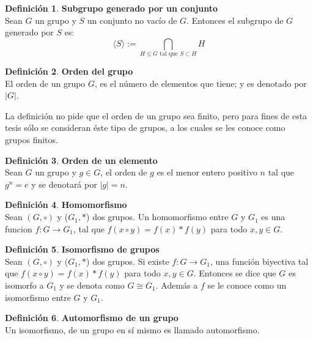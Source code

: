 \documentclass[11pt]{book}
\theoremstyle{definition}
\newtheorem{definition}{Definición}
\begin{document}
\begin{definition}\textbf{Subgrupo generado por un conjunto}\\
  Sean $G$ un grupo y $S$ un conjunto no vacío de $G$. Entonces el
  subgrupo de $G$ generado por $S$ es:
\begin{equation*}
\langle S \rangle := \bigcap_{\text{$H\le G$ tal que $S \subset H$}}H
\end{equation*}
\end{definition}

\begin{definition}\textbf{Orden del grupo}\\
  El orden de un grupo $G$, es el número de elementos que tiene; y es
  denotado por $|G|$.
\end{definition}

La definición no pide que el orden de un grupo sea finito, pero
para fines de esta tesis sólo se consideran éste tipo de grupos, a los
cuales se les conoce como grupos finitos.

\begin{definition}\textbf{Orden de un elemento}\\
  Sean $G$ un grupo y $g\in G$, el orden de $g$ es el menor entero
  positivo $n$ tal que $g^n=e$ y se denotará por $|g|=n$.
\end{definition}

\begin{definition}{\textbf{Homomorfismo}}\\ Sean $(G,\circ)$ y ($G_1, \ast$) dos grupos. 
Un homomorfismo entre $G$ y $G_1$ es una funcion $f : G \rightarrow G_1$, tal que $f(x\circ
  y)=f(x)\ast f(y)$ para todo $x,y\in G$.
\end{definition}

\begin{definition}\textbf{Isomorfismo de grupos}\\
  Sean $(G,\circ)$ y ($G_1, \ast$) dos grupos. Si existe $f : G
  \rightarrow G_1$, una función biyectiva tal que $f(x\circ
  y)=f(x)\ast f(y)$ para todo $x,y\in G$. Entonces se dice que $G$ es
  isomorfo a $G_1$ y se denota como $G\cong G_1$. Además a $f$ se le
  conoce como un isomorfismo entre $G$ y $G_1$.
\end{definition}


\begin{definition}\textbf{Automorfismo de un grupo}\\
  Un isomorfismo, de un grupo en sí mismo es llamado automorfismo.
\end{definition}
\end{document}
